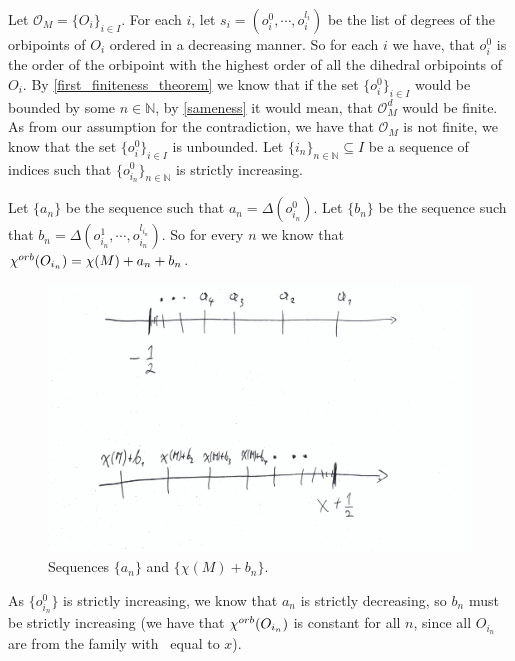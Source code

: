 

Let $\mathcal{O}_M = \{O_i\}_{i \in I}$. 
For each $i$, let $s_i = (o^0_i, \cdots, o^{l_i}_i)$ be the list of degrees of 
the orbipoints  
of $O_i$ ordered in a decreasing manner. 
So for each $i$ we have, that $o^0_i$ is 
the order of the orbipoint with the highest order of all the dihedral orbipoints of 
$O_i$. 
By \ref{first_finiteness_theorem} we know that if the set $\{o^0_i\}_{i \in I}$ 
would be bounded 
by some $n \in \mathbb{N}$, by \ref{sameness} 
it would mean, that $\mathcal{O}_M^d$ would be finite. As 
from our assumption for the contradiction, we have that $\mathcal{O}_M$ is not finite, we know
that the set $\{o^0_i\}_{i \in I}$ is unbounded. 
Let $\{i_n\}_{n\in \mathbb{N}} \subseteq I$ be a sequence of indices such that
$\{o^0_{i_n}\}_{n\in \mathbb{N}}$ is strictly increasing. 

Let $\{a_n\}$ be the sequence such that $a_n = \Delta(o^0_{i_n})$.
Let $\{b_n\}$ be the sequence such that $b_n = \Delta(o^1_{i_n},
\cdots, o^{l_{i_n}}_{i_n})$. 
So for every $n$ we know that ${\chi^{orb}(O_{i_n})} = \chi(M) + a_n + b_n$. 
\begin{figure}[H]
\centering
\includegraphics[width=\textwidth]{"../counting_orbifolds/anbn.jpg"}
\caption{Sequences $\{a_n\}$ and $\{\chi(M) + b_n\}$.}
\end{figure}
As $\{o^0_{i_n}\}$ 
is strictly 
increasing, we know 
that $a_n$ is strictly decreasing, so $b_n$ must be strictly 
increasing  
(we have that ${\chi^{orb}(O_{i_n})}$ is constant for all $n$, since all $O_{i_n}$ 
are from the family with \Eoc\ equal to $x$). 

